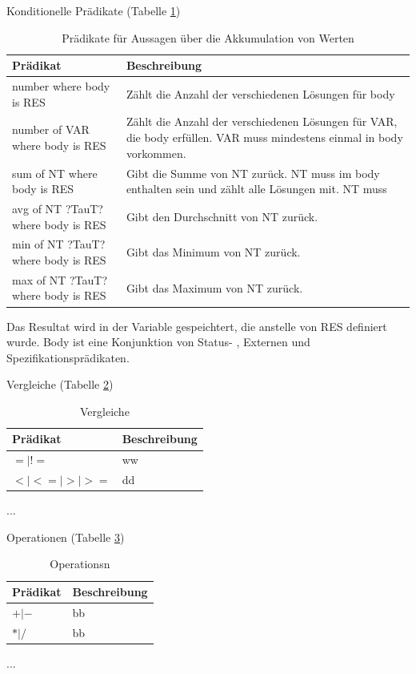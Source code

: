 Konditionelle Prädikate (Tabelle \ref{tab:conditional})
\begin{table}[h]
\begin{tabular} {|p{6cm}|p{10cm}|}
\hline
\textbf{Prädikat} & \textbf{Beschreibung}\\
\hline
number where body is RES		& Zählt die Anzahl der verschiedenen Lösungen für body \\
\hline
number of VAR where body is RES	& Zählt die Anzahl der verschiedenen Lösungen für VAR, die body erfüllen. VAR muss mindestens einmal in body vorkommen.\\
\hline
sum of NT where body is RES		& Gibt die Summe von NT zurück. NT muss im body enthalten sein und zählt alle Lösungen mit. NT muss\\
\hline
avg of NT ?TauT? where body is RES		& Gibt den Durchschnitt von NT zurück.\\
\hline
min of NT ?TauT? where body is RES		& Gibt das Minimum von NT zurück.\\
\hline
max of NT ?TauT? where body is RES		& Gibt das Maximum von NT zurück.\\
\hline
\end{tabular}
Das Resultat wird in der Variable gespeichtert, die anstelle von RES definiert wurde. Body ist eine Konjunktion von Status- , Externen und Spezifikationsprädikaten.
\caption{Prädikate für Aussagen über die Akkumulation von Werten}
\label{tab:conditional}
\end{table}


Vergleiche (Tabelle \ref{tab:comparison})
\begin{table}[h]
\begin{tabular} {|p{6cm}|p{10cm}|}
\hline
\textbf{Prädikat} & \textbf{Beschreibung}\\
\hline
 $= | !=$		& ww \\
 $< | <= | > | >=$   	& dd \\
\hline
\end{tabular}
...
\caption{Vergleiche}
\label{tab:comparison}
\end{table}

Operationen (Tabelle \ref{tab:operations})
\begin{table}[h]
\begin{tabular} {|p{6cm}|p{10cm}|}
\hline
\textbf{Prädikat} & \textbf{Beschreibung}\\
\hline
 $+ |-$		& bb \\
 $ * | / $   	& bb \\
\hline
\end{tabular}
...
\caption{Operationsn}
\label{tab:operations}
\end{table}

